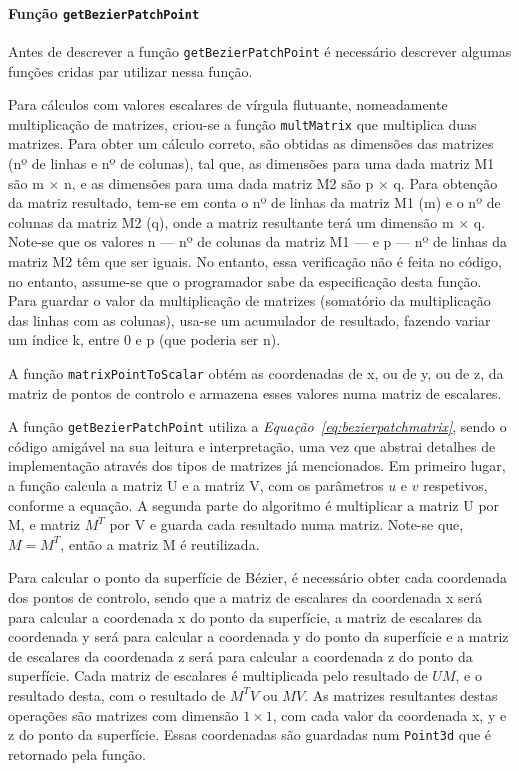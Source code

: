 \paragraph{Função \texttt{getBezierPatchPoint}}

Antes de descrever a função \texttt{getBezierPatchPoint} é necessário descrever
algumas funções cridas par utilizar nessa função. 

Para cálculos com valores escalares de vírgula flutuante, nomeadamente
multiplicação de matrizes, criou-se a função \texttt{multMatrix} que multiplica
duas matrizes. Para obter um cálculo correto, são obtidas as dimensões das
matrizes (nº de linhas e nº de colunas), tal que, as dimensões para uma dada
matriz M1 são m $\times$ n, e as dimensões para uma dada 
matriz M2 são p $\times$ q. Para obtenção da matriz resultado, tem-se em conta
o nº de linhas da matriz M1 (m) e o nº de colunas da matriz M2 (q), onde
a matriz resultante terá um dimensão m $\times$ q. Note-se que os valores n ---
nº de colunas da matriz M1 --- e p --- nº de linhas da matriz M2 têm que ser
iguais. No entanto, essa verificação não é feita no código, no entanto,
assume-se que o programador sabe da especificação desta função. Para guardar
o valor da multiplicação de matrizes (somatório da multiplicação das linhas com
as colunas), usa-se um acumulador de resultado, fazendo variar um índice k,
entre 0 e p (que poderia ser n).

A função \texttt{matrixPointToScalar} obtém as coordenadas de x, ou de y, ou de
z, da matriz de pontos de controlo e armazena esses valores numa matriz de
escalares.


A função \texttt{getBezierPatchPoint} utiliza
a \emph{Equação~\ref{eq:bezierpatchmatrix}}, sendo o código amigável na sua
leitura e interpretação, uma vez que abstrai detalhes de implementação através
dos tipos de matrizes já mencionados. Em primeiro lugar,  a função calcula
a matriz U e a matriz V, com os parâmetros $u$ e $v$ respetivos, conforme
a equação. A segunda parte do algoritmo é multiplicar a matriz U por M, e matriz
$M^T$ por V e guarda cada resultado numa matriz. Note-se que, $M = M^T$, então
a matriz M é reutilizada.

Para calcular o ponto da superfície de Bézier, é necessário obter cada
coordenada dos pontos de controlo, sendo que a matriz de escalares da coordenada
x será para calcular a coordenada x do ponto da superfície, a matriz de
escalares da coordenada y será para calcular a coordenada y do ponto da
superfície e  a matriz de escalares da coordenada z será para calcular
a coordenada z do ponto da superfície. Cada matriz de escalares é multiplicada
pelo resultado de $UM$, e o resultado desta, com o resultado de $M^{T}V$ ou $MV$.
As matrizes resultantes destas operações são matrizes com dimensão $1\times1$,
com cada valor da coordenada x, y e z do ponto da superfície. Essas coordenadas
são guardadas num \texttt{Point3d} que é retornado pela função. 

